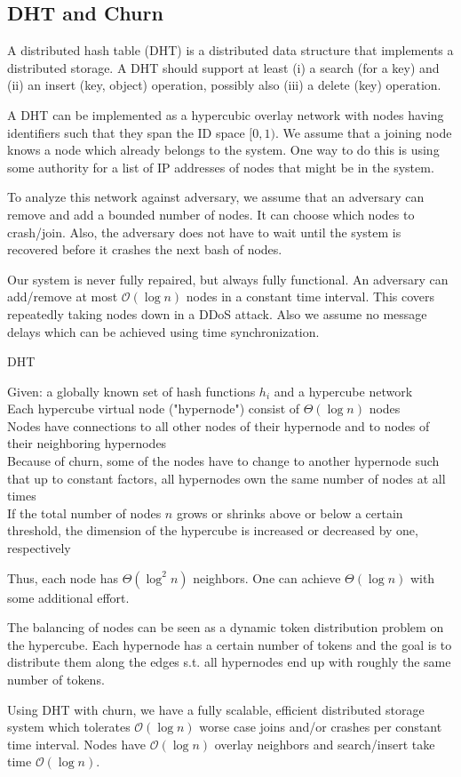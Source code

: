 \subsection{DHT and Churn}

A distributed hash table (DHT) is a distributed data structure that implements a distributed storage. A DHT should support at least (i) a search (for a key) and (ii) an insert (key, object) operation, possibly also (iii) a delete (key) operation. \medskip

A DHT can be implemented as a hypercubic overlay network with nodes having identifiers such that they span the ID space $[0, 1)$. We assume that a joining node knows a node which already belongs to the system. One way to do this is using some authority for a list of IP addresses of nodes that might be in the system. \medskip

To analyze this network against adversary, we assume that an adversary can remove and add a bounded number of nodes. It can choose which nodes to crash/join. Also, the adversary does not have to wait until the system is recovered before it crashes the next bash of nodes. \medskip

Our system is never fully repaired, but always fully functional. An adversary can add/remove at most $\mathcal O (\log n)$ nodes in a constant time interval. This covers repeatedly taking nodes down in a DDoS attack. Also we assume no message delays which can be achieved using time synchronization.\medskip

\begin{algorithm}[H]
\caption{DHT}
	Given: a globally known set of hash functions $h_i$ and a hypercube network \\
	Each hypercube virtual node ("hypernode") consist of $\Theta(\log n)$ nodes \\
	Nodes have connections to all other nodes of their hypernode and to nodes of their neighboring hypernodes \\
	Because of churn, some of the nodes have to change to another hypernode such that up to constant factors, all hypernodes own the same number of nodes at all times \\
	If the total number of nodes $n$ grows or shrinks above or below a certain threshold, the dimension of the hypercube is increased or decreased by one, respectively
\end{algorithm}
\medskip

Thus, each node has $\Theta(\log^2 n)$ neighbors. One can achieve $\Theta (\log n)$ with some additional effort. \medskip

The balancing of nodes can be seen as a dynamic token distribution problem on the hypercube. Each hypernode has a certain number of tokens and the goal is to distribute them along the edges s.t. all hypernodes end up with roughly the same number of tokens. \medskip

Using DHT with churn, we have a fully scalable, efficient distributed storage system which tolerates $\mathcal O(\log n)$ worse case joins and/or crashes per constant time interval. Nodes have $\mathcal O (\log n)$ overlay neighbors and search/insert take time $\mathcal O (\log n)$.


